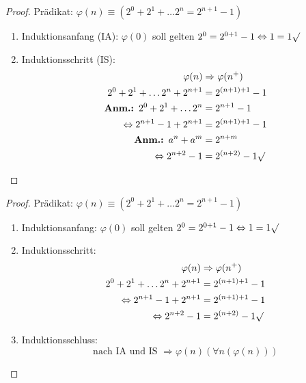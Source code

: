 \documentclass[12pt%
,aspectratio=169%
]{beamer}
\begin{document}
\begin{frame}
\begin{proof}
Prädikat: $\varphi(n) \equiv (2^0 + 2^1 + \dots 2^n = 2^{n+1}-1)$
\begin{enumerate}
	\item Induktionsanfang (IA): $\varphi(0)$ soll gelten
$2^0 = 2^{0+1}-1 \Leftrightarrow 1 = 1 \surd$\\
	\item Induktionsschritt (IS):
\begin{align*}
\varphi(n) & \Rightarrow \varphi(n^+)\\
2^0 + 2^1 + \dots 2^n + 2^{n+1} &= 2^{(n+1)+1}-1\\
\textbf{Anm.: } 2^0 + 2^1 + \dots 2^n &= 2^{n+1} -1  \\
\Leftrightarrow  2^{n+1} -1 + 2^{n+1} &= 2^{(n+1)+1}-1\\
\textbf{Anm.: } a^n + a^m &= 2^{n+m}\\
\Leftrightarrow  2^{n+2} -1 &= 2^{(n+2)}-1 \surd
\end{align*}
\end{enumerate}
\end{proof}
\end{frame}

\begin{frame}
\begin{proof}
Prädikat: $\varphi(n) \equiv (2^0 + 2^1 + \dots 2^n = 2^{n+1}-1)$
\begin{enumerate}
	\item Induktionsanfang: $\varphi(0)$ soll gelten
$2^0 = 2^{0+1}-1 \Leftrightarrow 1 = 1 \surd$\\
	\item Induktionsschritt:
\begin{align*}
\varphi(n) & \Rightarrow \varphi(n^+)\\
2^0 + 2^1 + \dots 2^n + 2^{n+1} &= 2^{(n+1)+1}-1\\
\Leftrightarrow  2^{n+1} -1 + 2^{n+1} &= 2^{(n+1)+1}-1\\
\Leftrightarrow  2^{n+2} -1 &= 2^{(n+2)}-1 \surd
\end{align*}
	\item Induktionsschluss:
$$\text{nach IA und IS } \Rightarrow \varphi(n) (\forall n(\varphi(n)))$$
\end{enumerate}
\end{proof}
\end{frame}
\end{document}
